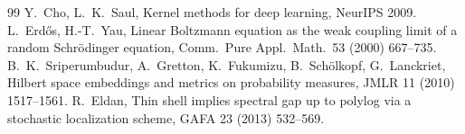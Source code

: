 \documentclass[11pt]{article}
\theoremstyle{plain}
\theoremstyle{definition}\newtheorem{definition}[theorem]{Definition}\newtheorem{remark}[theorem]{Remark}
\begin{document}
\begin{thebibliography}{99}
 Y.~Cho, L.~K.~Saul, Kernel methods for deep learning, NeurIPS 2009.
 L.~Erd\H{o}s, H.-T.~Yau, Linear Boltzmann equation as the weak coupling limit of a random Schr\"odinger equation, Comm.~Pure Appl.~Math.~53 (2000) 667--735.
 B.~K.~Sriperumbudur, A.~Gretton, K.~Fukumizu, B.~Sch\"olkopf, G.~Lanckriet, Hilbert space embeddings and metrics on probability measures, JMLR 11 (2010) 1517--1561.
 R.~Eldan, Thin shell implies spectral gap up to polylog via a stochastic localization scheme, GAFA 23 (2013) 532--569.
\end{thebibliography}
\end{document}
